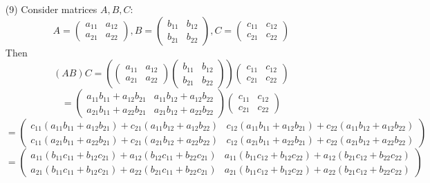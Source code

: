 \documentclass[12pt]{article}
\begin{document}
\begin{itemize}
\item[(9)]Consider matrices $A, B, C$:
$$A = \begin{pmatrix}
a_{11} & a_{12} \\
a_{21} & a_{22}
\end{pmatrix}, B = \begin{pmatrix}
b_{11} & b_{12} \\
b_{21} & b_{22}
\end{pmatrix}, C = \begin{pmatrix}
c_{11} & c_{12} \\
c_{21} & c_{22}
\end{pmatrix}$$
Then
\tiny
$$(AB)C = \left( \begin{pmatrix}
a_{11} & a_{12} \\
a_{21} & a_{22}
\end{pmatrix}\begin{pmatrix}
b_{11} & b_{12} \\
b_{21} & b_{22}
\end{pmatrix} \right)\begin{pmatrix}
c_{11} & c_{12} \\
c_{21} & c_{22}
\end{pmatrix}$$
$$= \begin{pmatrix}
a_{11}b_{11} + a_{12}b_{21} & a_{11}b_{12} + a_{12}b_{22} \\
a_{21}b_{11} + a_{22}b_{21} & a_{21}b_{12} + a_{22}b_{22}
\end{pmatrix}\begin{pmatrix}
c_{11} & c_{12} \\
c_{21} & c_{22}
\end{pmatrix}$$
$$= \begin{pmatrix}
c_{11}(a_{11}b_{11} + a_{12}b_{21}) + c_{21}(a_{11}b_{12} + a_{12}b_{22}) & c_{12}(a_{11}b_{11} + a_{12}b_{21}) + c_{22}(a_{11}b_{12} + a_{12}b_{22}) \\
c_{11}(a_{21}b_{11} + a_{22}b_{21}) +  c_{21}(a_{21}b_{12} + a_{22}b_{22}) & c_{12}(a_{21}b_{11} + a_{22}b_{21}) +  c_{22}(a_{21}b_{12} + a_{22}b_{22})
\end{pmatrix}$$
$$= \begin{pmatrix}
a_{11}(b_{11}c_{11} + b_{12}c_{21}) + a_{12}(b_{12}c_{11} + b_{22}c_{21}) & a_{11}(b_{11}c_{12} + b_{12}c_{22}) + a_{12}(b_{21}c_{12} + b_{22}c_{22}) \\
a_{21}(b_{11}c_{11} + b_{12}c_{21}) + a_{22}(b_{21}c_{11} + b_{22}c_{21}) & a_{21}(b_{11}c_{12} + b_{12}c_{22}) + a_{22}(b_{21}c_{12} + b_{22}c_{22})
\end{pmatrix}$$

\end{itemize}
\end{document}
